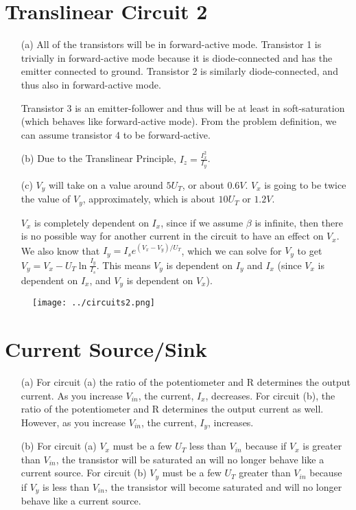 \documentclass{article}
\begin{document}
\section{Translinear Circuit 2}
    \begin{itemize}
        \item [(a)]
            All of the transistors will be in forward-active mode. Transistor 1 is trivially in forward-active mode because it is diode-connected and has the emitter connected to ground. Transistor 2 is similarly diode-connected, and thus also in forward-active mode.

            Transistor 3 is an emitter-follower and thus will be at least in soft-saturation (which behaves like forward-active mode). From the problem definition, we can assume transistor 4 to be forward-active.

        \item [(b)]
            Due to the Translinear Principle, $I_z = \frac{I_x^2}{I_y}$.

        \item [(c)]
            $V_y$ will take on a value around $5U_T$, or about $0.6V$. $V_x$ is going to be twice the value of $V_y$, approximately, which is about $10U_T$ or $1.2V$.
            
            $V_x$ is completely dependent on $I_x$, since if we assume $\beta$ is infinite, then there is no possible way for another current in the circuit to have an effect on $V_x$. We also know that $I_y = I_se^{(V_x - V_y)/U_T}$, which we can solve for $V_y$ to get $V_y = V_x - U_T\ln\frac{I_y}{I_s}$. This means $V_y$ is dependent on $I_y$ and $I_x$ (since $V_x$ is dependent on $I_x$, and $V_y$ is dependent on $V_x$).

    \end{itemize}

\begin{figure}[h]
    \centering
    \texttt{[image: ../circuits2.png]}
    \caption{}
    \label{fig:2}
\end{figure}

\section{Current Source/Sink}
    \begin{itemize}
        \item [(a)]
            For circuit (a) the ratio of the potentiometer and R determines the output current. As you increase $V_{in}$, the current, $I_x$, decreases.
            For circuit (b), the ratio of the potentiometer and R determines the output current as well. However, as you increase $V_{in}$, the current, $I_y$, increases.

        \item [(b)]
            For circuit (a) $V_x$ must be a few $U_T$ less than $V_{in}$ because if $V_x$ is greater than $V_{in}$, the transistor will be saturated an will no longer behave like a current source.
            For circuit (b) $V_y$ must be a few $U_T$ greater than $V_{in}$ because if $V_y$ is less than $V_{in}$, the transistor will become saturated and will no longer behave like a current source.
    \end{itemize}
\end{document}
